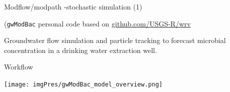 \documentclass[8pt,ignorenonframetext,]{beamer}
\newcommand{\columnsbegin}{\begin{columns}}
\begin{document}
\begin{frame}[fragile]{Modflow/modpath -stochastic simulation (1)}

(\texttt{gwModBac} personal code based on
\href{https://github.com/USGS-R/wrv}{github.com/USGS-R/wrv}

Groundwater flow simulation and particle tracking to forecast microbial
concentration in a drinking water extraction well.

\begin{block}{Workflow}

\texttt{[image: imgPres/gwModBac\_model\_overview.png]}

\end{block}

\end{frame}

\end{document}
